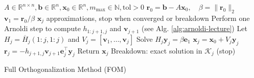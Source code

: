 \begin{algorithm}[htbp]
    \begin{algorithmic}
        \Require
        \State $A \in \mathbb{R}^{n \times n}, \mathbf{b} \in \mathbb{R}^n, \mathbf{x}_0 \in \mathbb{R}^n, m_{\max} \in \mathbb{N}, \text{tol} > 0$
        \State $\mathbf{r}_0 = \mathbf{b} - A\mathbf{x}_0, \quad \beta = \|\mathbf{r}_0\|_2$
        \State $\mathbf{v}_1 = \mathbf{r}_0 / \beta$
        \Ensure
        \State $\mathbf{x}_j$ approximations, stop when converged or breakdown
        \State Perform one Arnoldi step to compute $h_{1:j+1,j}$ and $\mathbf{v}_{j+1}$ (see Alg. \ref{alg:arnoldi-lecture})
        \State Let $H_j = \overline{H}_j(1:j,1:j)$ and $V_j = [\mathbf{v}_1,\ldots,\mathbf{v}_j]$
        \State Solve $H_j \mathbf{y}_j = \beta \mathbf{e}_1$
        \State $\mathbf{x}_j = \mathbf{x}_0 + V_j \mathbf{y}_j$
        \State $\mathbf{r}_j = -h_{j+1,j} \mathbf{v}_{j+1} \mathbf{e}_j^\top \mathbf{y}_j$
        \State Return $\mathbf{x}_j$
        \EndIf
        \State Breakdown: exact solution in $\mathcal{K}_j$ (stop)
        \EndIf
        \EndFor
    \end{algorithmic}
    \caption{Full Orthogonalization Method (FOM)}
    \label{alg:fom}
\end{algorithm}
